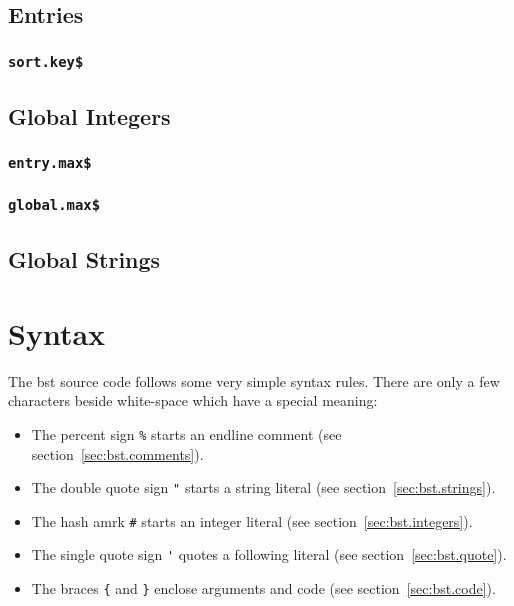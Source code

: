 \INCOMPLETE

\subsection{Entries}

\INCOMPLETE

\subsubsection{\texttt{sort.key\$}}%

\INCOMPLETE


\subsection{Global Integers}

\INCOMPLETE

\subsubsection{\texttt{entry.max\$}}%

\INCOMPLETE
\subsubsection{\texttt{global.max\$}}%

\INCOMPLETE

\subsection{Global Strings}

\INCOMPLETE


\section{Syntax}

The bst source code follows some very simple syntax rules. There are
only a few characters beside white-space which have a special meaning:

\begin{itemize}
\item The percent sign \verb|%| starts an endline comment (see
  section~\ref{sec:bst.comments}).
\item The double quote sign \verb|"| starts a string literal (see
  section~\ref{sec:bst.strings}).
\item The hash amrk \verb|#| starts an integer literal (see
  section~\ref{sec:bst.integers}).
\item The single quote sign \verb|'| quotes a following literal (see
  section~\ref{sec:bst.quote}).
\item The braces \verb|{| and \verb|}| enclose arguments and code (see
  section~\ref{sec:bst.code}).
\end{itemize}


